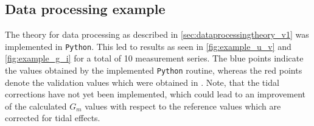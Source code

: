 \documentclass{report}
\numberwithin{tm}{section}
\begin{document}
\subsection{Data processing example}
The theory for data processing as described in \cref{sec:dataprocessingtheory_v1} was implemented in \verb|Python|. This led to results as seen in \cref{fig:example_u_v} and \cref{fig:example_g_i} for a total of 10 measurement series. The blue points indicate the values obtained by the implemented \verb|Python| routine, whereas the red points denote the validation values which were obtained in \cite{Eichenberger_2022}. Note, that the tidal corrections have not yet been implemented, which could lead to an improvement of the calculated $G_m$ values with respect to the reference values which are corrected for tidal effects.
\end{document}
